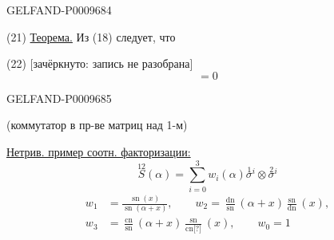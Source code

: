 \begin{GelfandAdjacentEvidence}{GELFAND-P000968}{4}


(21) \underline{Теорема.} Из (18) следует, что

(22) [зачёркнуто: запись не разобрана]
\begin{equation*}
 [\operatorname{Sp}_3\overset{13}{S},\ \operatorname{Sp}_3\overset{13}{S}']=0
\end{equation*}
\end{GelfandAdjacentEvidence}
\begin{GelfandAdjacentEvidence}{GELFAND-P000968}{5}


(коммутатор в пр-ве матриц над 1-м)

\underline{Нетрив. пример соотн. факторизации:}
\begin{equation*}
 \overset{12}{S}(\alpha)=\sum_{i=0}^{3}
 w_i(\alpha)\overset{1}{\sigma}{}^{i}\otimes\overset{2}{\sigma}{}^{i}\tag{23}
\end{equation*}
\begin{equation*}
\begin{aligned}
 w_1&=\frac{\operatorname{sn}(x)}{\operatorname{sn}(\alpha+x)},\qquad
 w_2=\frac{\operatorname{dn}}{\operatorname{sn}}(\alpha+x)
     \frac{\operatorname{sn}}{\operatorname{dn}}(x),\\
 w_3&=\frac{\operatorname{cn}}{\operatorname{sn}}(\alpha+x)
     \frac{\operatorname{sn}}{\operatorname{cn}\text{[?]}}(x),\qquad
 w_0=1
\end{aligned}\tag{24}
\end{equation*}
\end{GelfandAdjacentEvidence}
